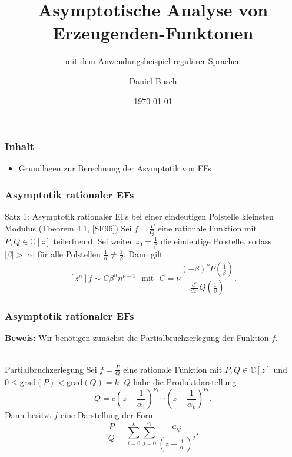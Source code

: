\documentclass{beamer}
\begin{document}
\title[Asymptotische Analyse von EFs]{Asymptotische Analyse von Erzeugenden-Funktonen}
\subtitle{mit dem Anwendungsbeispiel regulärer Sprachen}
\author{Daniel Busch}
\date{\today}

\begin{frame}
  \titlepage
\end{frame}

\begin{frame}\frametitle{Inhalt}
  \begin{itemize}
    \item Grundlagen zur Berechnung der Asymptotik von EFs
  \end{itemize}
\end{frame}

\begin{frame}\frametitle{Asymptotik rationaler EFs}
  \begin{block}{Satz 1: Asymptotik rationaler EFs bei einer eindeutigen Polstelle kleinsten Modulus (Theorem 4.1, [SF96])}
  	Sei $f = \frac{P}{Q}$ eine rationale Funktion mit $P, Q \in \mathbb{C}[z]$ teilerfremd. Sei weiter $z_0 = \frac{1}{\beta}$ die eindeutige Polstelle, sodass $|\beta| > |\alpha|$ für alle Polstellen $\frac{1}{\alpha} \neq \frac{1}{\beta}$. Dann gilt
  	\[
  	  [z^n] f \sim C \beta^n n^{\nu - 1} \,\, \text{ mit } \,\, C = \nu \frac{(-\beta)^\nu P(\frac{1}{\beta})}{\frac{d^\nu}{dz^\nu} Q(\frac{1}{\beta})} \text{.}
  	\]
  \end{block}
\end{frame}

\begin{frame}\frametitle{Asymptotik rationaler EFs}
  \textbf{Beweis:}
  Wir benötigen zunächst die Partialbruchzerlegung der Funktion $f$. \\
  \qquad \\
  \begin{block}{Partialbruchzerlegung}
    Sei $f = \frac{P}{Q}$ eine rationale Funktion mit $P, Q \in \mathbb{C}[z]$ und $0 \leq \text{grad}(P) < \text{grad}(Q) = k$. $Q$ habe die Produktdarstellung
    \[
      Q = c (z - \frac{1}{\alpha_1})^{\nu_1} \cdots (z - \frac{1}{\alpha_k})^{\nu_k} \text{.}
    \]
    Dann besitzt $f$ eine Darstellung der Form
    \[
      \frac{P}{Q} = \sum\limits_{i = 0}^k \sum\limits_{j = 0}^{\nu_i} \frac{a_{ij}}{(z - \frac{1}{\alpha_i})^j} \text{.}
    \]
  \end{block}
\end{frame}
\end{document}
